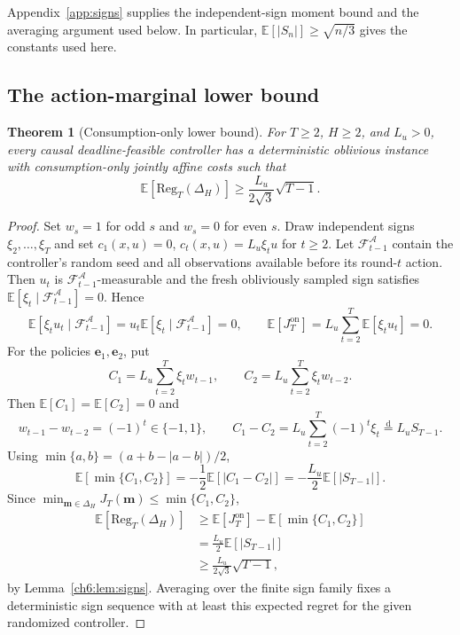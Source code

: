 \documentclass[11pt]{article}
\newcommand{\E}{\mathbb{E}}
\newcommand{\Reg}{\mathrm{Reg}}
\theoremstyle{plain}
\newtheorem{Thm:Theorem}{Theorem}[section]
\theoremstyle{remark}
\numberwithin{equation}{section}
\begin{document}
Appendix~\ref{app:signs} supplies the independent-sign moment bound
and the averaging argument used below. In particular,
$\E[|S_n|]\ge\sqrt{n/3}$ gives the constants used here.

\subsection{The action-marginal lower bound}
\begin{Thm:Theorem}[Consumption-only lower bound]\label{ch6:thm:lower-action}
For $T\ge2$, $H\ge2$, and $L_u>0$, every causal deadline-feasible controller
has a deterministic oblivious instance with consumption-only jointly affine
costs such that
\begin{equation}\label{ch6:eq:lower-action}
 \E[\Reg_T(\Delta_H)]\ge\frac{L_u}{2\sqrt3}\sqrt{T-1}.
\end{equation}
\end{Thm:Theorem}
\begin{proof}
Set $w_s=1$ for odd $s$ and $w_s=0$ for even $s$. Draw independent signs
$\xi_2,\ldots,\xi_T$ and set
$c_1(x,u)=0$, $c_t(x,u)=L_u\xi_tu$ for $t\ge2$.
Let $\mathcal F_{t-1}^{\mathcal A}$ contain the controller's random seed
and all observations available before its round-$t$ action.  Then
$u_t$ is $\mathcal F_{t-1}^{\mathcal A}$-measurable and the fresh
obliviously sampled sign satisfies
$\E[\xi_t\mid\mathcal F_{t-1}^{\mathcal A}]=0$.  Hence
\[
\E[\xi_tu_t\mid\mathcal F_{t-1}^{\mathcal A}]
=u_t\E[\xi_t\mid\mathcal F_{t-1}^{\mathcal A}]=0,
\qquad
\E[J_T^{\mathrm{on}}]=L_u\sum_{t=2}^{T}\E[\xi_tu_t]=0.
\]
For the policies $\mathbf e_1,\mathbf e_2$, put
\[
C_1=L_u\sum_{t=2}^{T}\xi_tw_{t-1},
\qquad
C_2=L_u\sum_{t=2}^{T}\xi_tw_{t-2}.
\]
Then $\E[C_1]=\E[C_2]=0$ and
\[
w_{t-1}-w_{t-2}=(-1)^t\in\{-1,1\},
\qquad
C_1-C_2=L_u\sum_{t=2}^{T}(-1)^t\xi_t
\stackrel{\mathrm{d}}{=}L_uS_{T-1}.
\]
Using $\min\{a,b\}=(a+b-|a-b|)/2$,
\[
\E[\min\{C_1,C_2\}]
=-\frac12\E[|C_1-C_2|]
=-\frac{L_u}{2}\E[|S_{T-1}|].
\]
Since $\min_{\mathbf m\in\Delta_H}J_T(\mathbf m)\le\min\{C_1,C_2\}$,
\begin{align*}
\E[\Reg_T(\Delta_H)]
&\ge \E[J_T^{\mathrm{on}}]-\E[\min\{C_1,C_2\}]\\
&=\frac{L_u}{2}\E[|S_{T-1}|]\\
&\ge\frac{L_u}{2\sqrt3}\sqrt{T-1},
\end{align*}
by Lemma~\ref{ch6:lem:signs}.  Averaging over the finite sign family fixes
a deterministic sign sequence with at least this expected regret for the
given randomized controller.
\end{proof}
\end{document}
